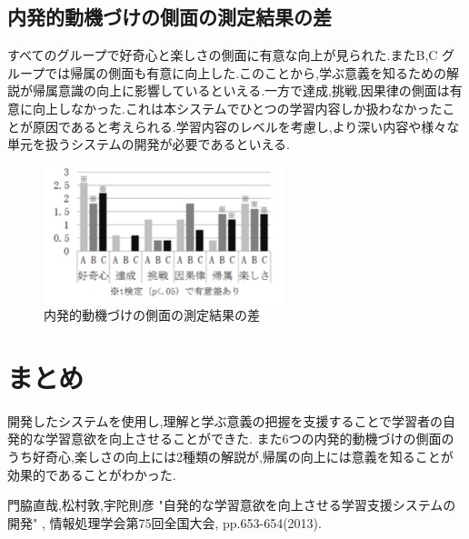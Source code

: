\documentclass{jsarticle}
\begin{document}
\subsection{内発的動機づけの側面の測定結果の差}

すべてのグループで好奇心と楽しさの側面に有意な向上が見られた.またB,C グループでは帰属の側面も有意に向上した.このことから,学ぶ意義を知るための解説が帰属意識の向上に影響しているといえる.一方で達成,挑戦,因果律の側面は有意に向上しなかった.これは本システムでひとつの学習内容しか扱わなかったことが原因であると考えられる.学習内容のレベルを考慮し,より深い内容や様々な単元を扱うシステムの開発が必要であるといえる.

\begin{figure}[H]
\centering
\includegraphics[bb=0 0 370 210, width=7cm]{0710-2.png}
\caption{内発的動機づけの側面の測定結果の差}
\end{figure}

\section{まとめ}
開発したシステムを使用し,理解と学ぶ意義の把握を支援することで学習者の自発的な学習意欲を向上させることができた.
また6つの内発的動機づけの側面のうち好奇心,楽しさの向上には2種類の解説が,帰属の向上には意義を知ることが効果的であることがわかった.



\begin{thebibliography}{99}
 門脇直哉,松村敦,宇陀則彦 "自発的な学習意欲を向上させる学習支援システムの開発" , 情報処理学会第75回全国大会, pp.653-654(2013).
\end{thebibliography}
\end{document}
